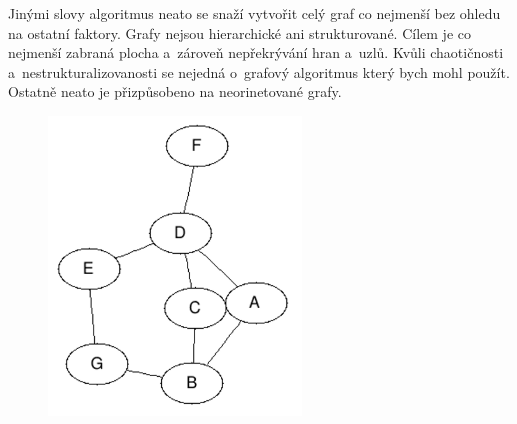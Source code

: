 \documentclass[color,table,oneside,nolot,nolof]{fithesis}
\begin{document}
	Jinými slovy algoritmus neato se snaží vytvořit celý graf co nejmenší bez ohledu na ostatní faktory. Grafy nejsou hierarchické ani 
	strukturované. Cílem je co nejmenší zabraná plocha a~zároveň nepřekrývání hran a~uzlů. Kvůli chaotičnosti a~nestrukturalizovanosti se nejedná o~grafový algoritmus který bych mohl
	použít. Ostatně neato je přizpůsobeno na neorinetované grafy.
\begin{figure}
	\centering
	\includegraphics[width=0.6\textwidth]{pictures/neato_example.png} 
\end{figure}
\end{document}
